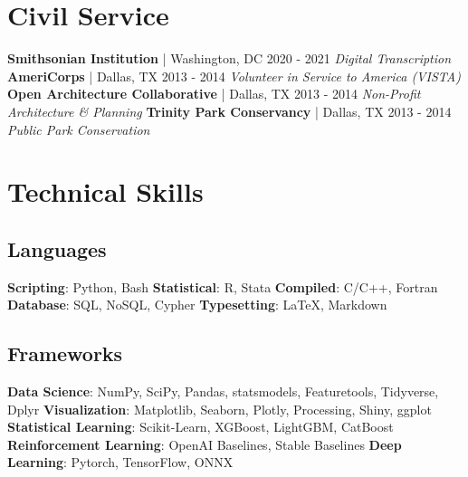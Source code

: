 \documentclass{article}
\begin{document}
    \section*{Civil Service}
        \textbf{Smithsonian Institution} | Washington, DC \hfill{2020 - 2021}\newline
        \textit{Digital Transcription}\newline\newline
        \textbf{AmeriCorps} | Dallas, TX \hfill{2013 - 2014}\newline
        \textit{Volunteer in Service to America (VISTA)}\newline\newline
        \textbf{Open Architecture Collaborative} | Dallas, TX \hfill{2013 - 2014}\newline
        \textit{Non-Profit Architecture \& Planning}\newline\newline
        \textbf{Trinity Park Conservancy} | Dallas, TX \hfill{2013 - 2014}\newline
        \textit{Public Park Conservation}
    \section*{Technical Skills}
    \subsection*{Languages}
        \textbf{Scripting}: Python, Bash\newline
        \textbf{Statistical}: R, Stata\newline
        \textbf{Compiled}: C/C++, Fortran\newline
        \textbf{Database}: SQL, NoSQL, Cypher\newline
        \textbf{Typesetting}: \LaTeX, Markdown
    \subsection*{Frameworks}
        \textbf{Data Science}: NumPy, SciPy, Pandas, statsmodels, Featuretools, Tidyverse, Dplyr\newline
        \textbf{Visualization}: Matplotlib, Seaborn, Plotly, Processing, Shiny, ggplot\newline
        \textbf{Statistical Learning}: Scikit-Learn, XGBoost, LightGBM, CatBoost\newline
        \textbf{Reinforcement Learning}: OpenAI Baselines, Stable Baselines\newline
        \textbf{Deep Learning}: Pytorch, TensorFlow, ONNX
\end{document}

